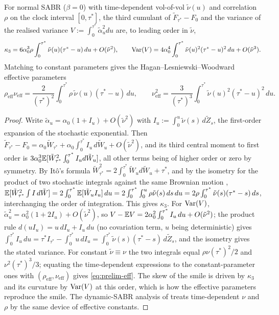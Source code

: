 \documentclass[../../../main.tex]{subfiles}
\begin{document}
\begin{proposition}\label{prop:prelim-nueff}
For normal SABR ($\beta=0$) with time-dependent vol-of-vol $\tilde\nu(u)$ and correlation $\rho$ on the clock interval $[0,\tau^*]$, the third cumulant of $\tilde F_{\tau^*}-F_0$ and the variance of the realised variance $V:=\int_0^{\tau^*}\tilde\alpha_u^2du$ are, to leading order in $\tilde\nu$,
\begin{equation}\label{eq:prelim-eff-weights}
\kappa_3=6\alpha_0^3\rho\int_0^{\tau^*}\tilde\nu(u)(\tau^*-u)\,du+O(\tilde\nu^2),\qquad
\operatorname{Var}(V)=4\alpha_0^4\int_0^{\tau^*}\tilde\nu(u)^2(\tau^*-u)^2\,du+O(\tilde\nu^3).
\end{equation}
Matching to constant parameters gives the Hagan--Lesniewski--Woodward effective parameters
\begin{equation}\label{eq:prelim-eff}
\rho_{\mathrm{eff}}\nu_{\mathrm{eff}}=\frac{2}{(\tau^*)^2}\int_0^{\tau^*}\rho\,\tilde\nu(u)(\tau^*-u)\,du,\qquad
\nu_{\mathrm{eff}}^2=\frac{3}{(\tau^*)^3}\int_0^{\tau^*}\tilde\nu(u)^2(\tau^*-u)^2\,du .
\end{equation}
\end{proposition}

\begin{proof}
Write $\tilde\alpha_u=\alpha_0(1+I_u)+O(\tilde\nu^2)$ with $I_u:=\int_0^u\tilde\nu(s)\,d\tilde Z_s$, the first-order expansion of the stochastic exponential. Then $\tilde F_{\tau^*}-F_0=\alpha_0\tilde W_{\tau^*}+\alpha_0\int_0^{\tau^*}I_u\,d\tilde W_u+O(\tilde\nu^2)$, and its third central moment to first order is $3\alpha_0^3\mathbb{E}[\tilde W_{\tau^*}^2\int_0^{\tau^*}I_ud\tilde W_u]$, all other terms being of higher order or zero by symmetry. By It\^o's formula $\tilde W_{\tau^*}^2=2\int_0^{\tau^*}\tilde W_ud\tilde W_u+\tau^*$, and by the isometry for the product of two stochastic integrals against the same Brownian motion \cite[Ch.~3, \S2]{karatzas1991}, $\mathbb{E}[\tilde W_{\tau^*}^2\int I\,d\tilde W]=2\int_0^{\tau^*}\mathbb{E}[\tilde W_uI_u]\,du=2\int_0^{\tau^*}\int_0^u\rho\tilde\nu(s)\,ds\,du=2\rho\int_0^{\tau^*}\tilde\nu(s)(\tau^*-s)\,ds$, interchanging the order of integration. This gives $\kappa_3$. For $\operatorname{Var}(V)$, $\tilde\alpha_u^2=\alpha_0^2(1+2I_u)+O(\tilde\nu^2)$, so $V-\mathbb{E} V=2\alpha_0^2\int_0^{\tau^*}I_u\,du+O(\tilde\nu^2)$; the product rule $d(uI_u)=u\,dI_u+I_u\,du$ (no covariation term, $u$ being deterministic) gives $\int_0^{\tau^*}I_u\,du=\tau^*I_{\tau^*}-\int_0^{\tau^*}u\,dI_u=\int_0^{\tau^*}\tilde\nu(s)(\tau^*-s)\,d\tilde Z_s$, and the isometry gives the stated variance. For constant $\tilde\nu\equiv\nu$ the two integrals equal $\rho\nu(\tau^*)^2/2$ and $\nu^2(\tau^*)^3/3$; equating the time-dependent expressions to the constant-parameter ones with $(\rho_{\mathrm{eff}},\nu_{\mathrm{eff}})$ gives \eqref{eq:prelim-eff}. The skew of the smile is driven by $\kappa_3$ and its curvature by $\operatorname{Var}(V)$ at this order, which is how the effective parameters reproduce the smile. The dynamic-SABR analysis of \cite[App.~B]{hagan2002} treats time-dependent $\nu$ and $\rho$ by the same device of effective constants.
\end{proof}
\end{document}
